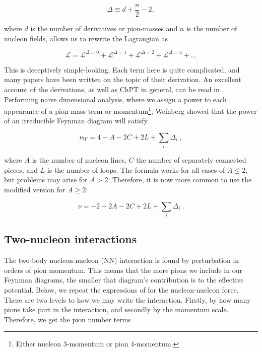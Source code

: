\documentclass[10pt,twoside]{report}
\begin{document}
	\begin{equation}
		\Delta \equiv d + \frac{n}{2} - 2,
	\end{equation}
	
	\noindent where $d$ is the number of derivatives or pion-masses and $n$ is the number of nucleon fields, allows us to rewrite the Lagrangian as
	
	\begin{equation}
		\mathcal{L} = \mathcal{L}^{\Delta = 0} + \mathcal{L}^{\Delta = 1} + \mathcal{L}^{\Delta = 2} + \mathcal{L}^{\Delta = 4} + \ldots
	\end{equation}
	
	This is deceptively simple-looking. Each term here is quite complicated, and many papers have been written on the topic of their derivation. An excellent account of the derivations, as well as ChPT in general, can be read in \cite{MachleidtEntem11}.  Performing naive dimensional analysis, where we assign a power to each appearance of a pion mass term or momentum\footnote{Either nucleon 3-momentum or pion 4-momentum.}, Weinberg showed that the power of an irreducible Feynman diagram will satisfy
	
	\begin{equation}
		\nu_W = 4-A-2C + 2L + \sum_i\Delta_i\:,
	\end{equation}
	
	\noindent where $A$ is the number of nucleon lines, $C$ the number of separately connected pieces, and $L$ is the number of loops. The formula works for all cases of $A\leq2$, but problems may arise for $A>2$. Therefore, it is now more common to use the modified version for $A\geq 2$:
	
	\begin{equation}
		\nu = -2+2A-2C+2L+\sum_i\Delta_i \:.
	\end{equation}
	
	
	
	\subsection{Two-nucleon interactions}
	The two-body nucleon-nucleon (NN) interaction is found by perturbation in orders of pion momentum. This means that the more pions we include in our Feynman diagrams, the smaller that diagram's contribution is to the effective potential. Below, we repeat the expressions of \cite{MachleidtEntem11} for the nucleon-nucleon force. There are two levels to how we may write the interaction. Firstly, by how many pions take part in the interaction, and secondly by the momentum scale. Therefore, we get the pion number terms
	
\end{document}
